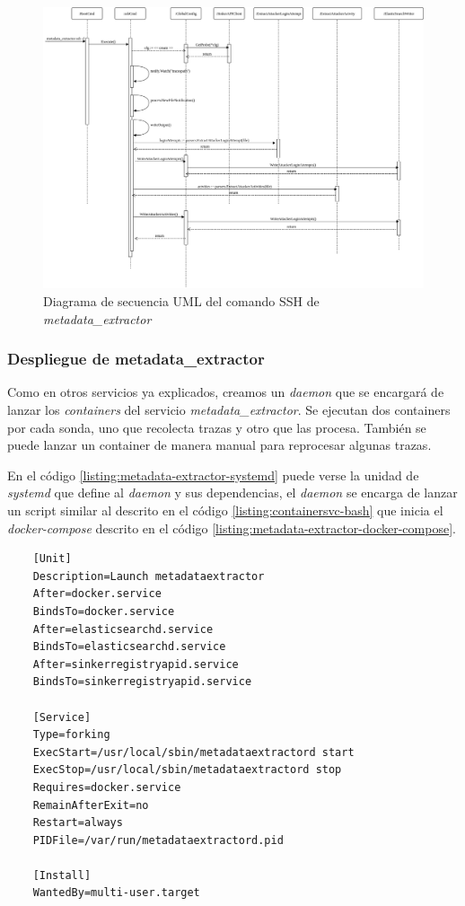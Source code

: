\begin{figure}
    \centering
    \includegraphics[scale=0.4]{images/UMLSequenceSSHOp}
    \caption{Diagrama de secuencia UML del comando SSH de \emph{metadata\_extractor}}
    \label{fig:uml-sequence-ssh-metadata-extractor}
\end{figure}

\subsubsection{Despliegue de metadata\_extractor}


Como en otros servicios ya explicados, creamos un \emph{daemon} que se encargará de lanzar los \emph{containers} del servicio \emph{metadata\_extractor}. Se ejecutan dos containers
por cada sonda, uno que recolecta trazas y otro que las procesa. También se puede lanzar un container de manera manual para reprocesar algunas trazas.

En el código \ref{listing:metadata-extractor-systemd} puede verse la unidad de \emph{systemd} que define al \emph{daemon} y sus dependencias,
el \emph{daemon} se encarga de lanzar un script similar al descrito en el código \ref{listing:containersvc-bash} que inicia el \emph{docker-compose}
descrito en el código \ref{listing:metadata-extractor-docker-compose}.


\begin{verbatim}
    [Unit]
    Description=Launch metadataextractor
    After=docker.service
    BindsTo=docker.service
    After=elasticsearchd.service
    BindsTo=elasticsearchd.service
    After=sinkerregistryapid.service
    BindsTo=sinkerregistryapid.service
    
    [Service]
    Type=forking
    ExecStart=/usr/local/sbin/metadataextractord start
    ExecStop=/usr/local/sbin/metadataextractord stop
    Requires=docker.service
    RemainAfterExit=no
    Restart=always
    PIDFile=/var/run/metadataextractord.pid
    
    [Install]
    WantedBy=multi-user.target    
         
\end{verbatim}
\bigskip


